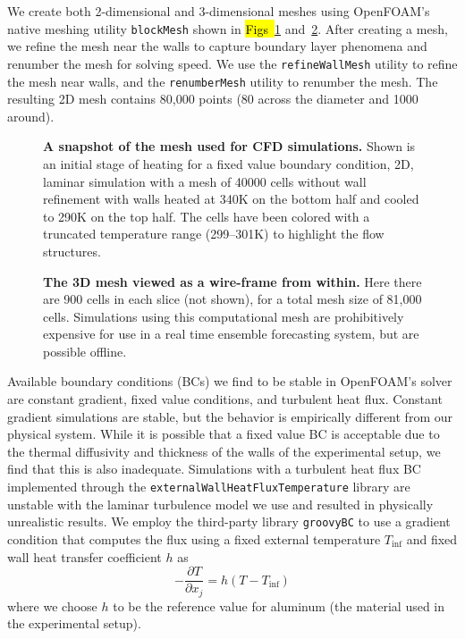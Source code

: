 \documentclass[10pt,letterpaper]{article}
\newcommand{\partialdiff}[2]{\frac{\partial #1}{\partial #2}}
\begin{document}
We create both 2-dimensional and 3-dimensional meshes using OpenFOAM's native meshing utility \verb|blockMesh| shown in \hl{Figs~}\ref{fig:CFDmesh1} and~\ref{fig:CFDmesh2}.
After creating a mesh, we refine the mesh near the walls to capture boundary layer phenomena and renumber the mesh for solving speed.
We use the \verb|refineWallMesh| utility to refine the mesh near walls, and the \verb|renumberMesh| utility to renumber the mesh.
The resulting 2D mesh contains 80,000 points (80 across the diameter and 1000 around).

\begin{figure}[h]
  \centering
  \caption[A snapshot of the mesh used for CFD simulations]{
\textbf{    A snapshot of the mesh used for CFD simulations.
}    Shown is an initial stage of heating for a fixed value boundary condition, 2D, laminar simulation with a mesh of 40000 cells without wall refinement with walls heated at 340K on the bottom half and cooled to 290K on the top half.
    The cells have been colored with a truncated temperature range (299--301K) to highlight the flow structures.
  }
  \label{fig:CFDmesh1}
\end{figure}

\begin{figure}[h]
  \centering
  \caption[The 3D mesh viewed as a wire-frame from within]{
\textbf{    The 3D mesh viewed as a wire-frame from within.
}    Here there are 900 cells in each slice (not shown), for a total mesh size of 81,000 cells.
    Simulations using this computational mesh are prohibitively expensive for use in a real time ensemble forecasting system, but are possible offline.
  }
  \label{fig:CFDmesh2}
\end{figure}

Available boundary conditions (BCs) we find to be stable in OpenFOAM's solver are constant gradient, fixed value conditions, and turbulent heat flux.
Constant gradient simulations are stable, but the behavior is empirically different from our physical system.
While it is possible that a fixed value BC is acceptable due to the thermal diffusivity and thickness of the walls of the experimental setup, we find that this is also inadequate.
Simulations with a turbulent heat flux BC implemented through the \verb|externalWallHeatFluxTemperature| library are unstable with the laminar turbulence model we use and resulted in physically unrealistic results.
We employ the third-party library \verb|groovyBC| to use a gradient condition that computes the flux using a fixed external temperature $T_\text{inf}$ and fixed wall heat transfer coefficient $h$ as $$ - \partialdiff{T}{x_j} = h \left( T-T_\text{inf} \right)$$ where we choose $h$ to be the reference value for aluminum (the material used in the experimental setup).
\end{document}
